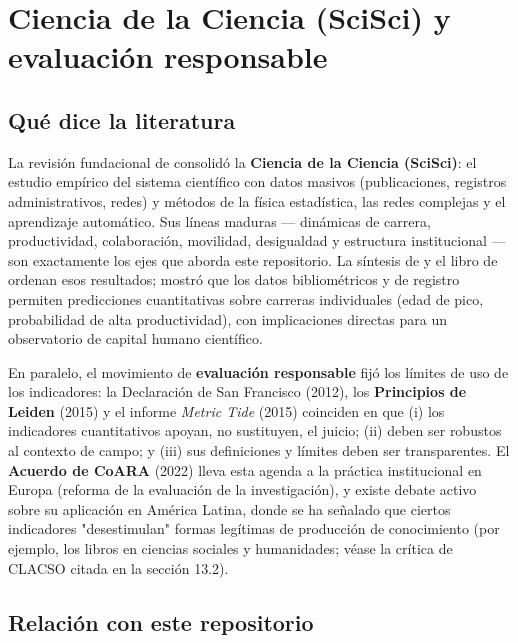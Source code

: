 \section{Ciencia de la Ciencia (SciSci) y evaluación responsable}

\subsection{Qué dice la literatura}

La revisión fundacional de \citet{fortunato2018science} consolidó la
\textbf{Ciencia de la Ciencia (SciSci)}: el estudio empírico del sistema
científico con datos masivos (publicaciones, registros administrativos, redes)
y métodos de la física estadística, las redes complejas y el aprendizaje
automático. Sus líneas maduras — dinámicas de carrera, productividad,
colaboración, movilidad, desigualdad y estructura institucional — son
exactamente los ejes que aborda este repositorio. La síntesis de
\citet{zeng2021science} y el libro de \citet{wang2021sciencebook} ordenan esos
resultados; \citet{clauset2017data} mostró que los datos bibliométricos y de
registro permiten predicciones cuantitativas sobre carreras individuales
(edad de pico, probabilidad de alta productividad), con implicaciones directas
para un observatorio de capital humano científico.

En paralelo, el movimiento de \textbf{evaluación responsable} fijó los límites
de uso de los indicadores: la Declaración de San Francisco
\citep{dora2012} (2012), los \textbf{Principios de Leiden}
\citep{hicks2015leiden} (2015) y el informe \emph{Metric Tide}
\citep{wilsdon2015metric} (2015) coinciden en que (i) los indicadores
cuantitativos apoyan, no sustituyen, el juicio; (ii) deben ser robustos al
contexto de campo; y (iii) sus definiciones y límites deben ser transparentes.
El \textbf{Acuerdo de CoARA} \citep{coara2022} (2022) lleva esta agenda a la
práctica institucional en Europa (reforma de la evaluación de la
investigación), y existe debate activo sobre su aplicación en América Latina,
donde se ha señalado que ciertos indicadores "desestimulan" formas legítimas de
producción de conocimiento (por ejemplo, los libros en ciencias sociales y
humanidades; véase la crítica de CLACSO citada en la sección 13.2).

\subsection{Relación con este repositorio}

